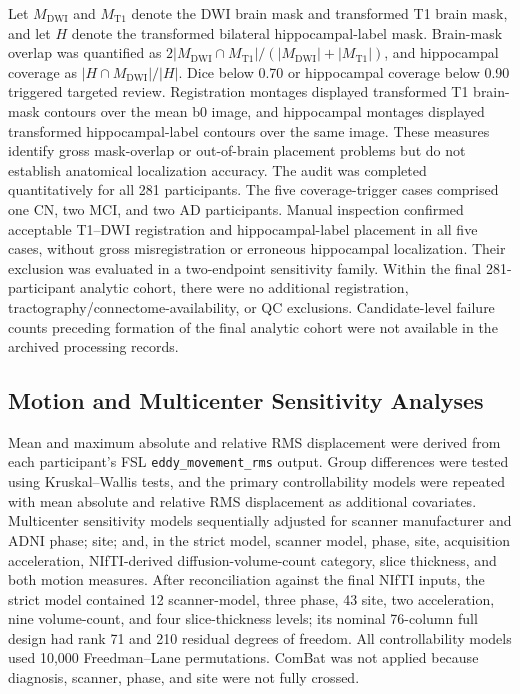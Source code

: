 \documentclass{article}
\begin{document}
Let $M_{\mathrm{DWI}}$ and $M_{\mathrm{T1}}$ denote the DWI brain mask and transformed T1 brain mask, and let $H$ denote the transformed bilateral hippocampal-label mask. Brain-mask overlap was quantified as $2|M_{\mathrm{DWI}}\cap M_{\mathrm{T1}}|/(|M_{\mathrm{DWI}}|+|M_{\mathrm{T1}}|)$, and hippocampal coverage as $|H\cap M_{\mathrm{DWI}}|/|H|$. Dice below 0.70 or hippocampal coverage below 0.90 triggered targeted review. Registration montages displayed transformed T1 brain-mask contours over the mean b0 image, and hippocampal montages displayed transformed hippocampal-label contours over the same image. These measures identify gross mask-overlap or out-of-brain placement problems but do not establish anatomical localization accuracy. The audit was completed quantitatively for all 281 participants. The five coverage-trigger cases comprised one CN, two MCI, and two AD participants. Manual inspection confirmed acceptable T1--DWI registration and hippocampal-label placement in all five cases, without gross misregistration or erroneous hippocampal localization. Their exclusion was evaluated in a two-endpoint sensitivity family. Within the final 281-participant analytic cohort, there were no additional registration, tractography/connectome-availability, or QC exclusions. Candidate-level failure counts preceding formation of the final analytic cohort were not available in the archived processing records.

\subsection{Motion and Multicenter Sensitivity Analyses}
Mean and maximum absolute and relative RMS displacement were derived from each participant's FSL \texttt{eddy\_movement\_rms} output. Group differences were tested using Kruskal--Wallis tests, and the primary controllability models were repeated with mean absolute and relative RMS displacement as additional covariates. Multicenter sensitivity models sequentially adjusted for scanner manufacturer and ADNI phase; site; and, in the strict model, scanner model, phase, site, acquisition acceleration, NIfTI-derived diffusion-volume-count category, slice thickness, and both motion measures. After reconciliation against the final NIfTI inputs, the strict model contained 12 scanner-model, three phase, 43 site, two acceleration, nine volume-count, and four slice-thickness levels; its nominal 76-column full design had rank 71 and 210 residual degrees of freedom. All controllability models used 10,000 Freedman--Lane permutations. ComBat was not applied because diagnosis, scanner, phase, and site were not fully crossed.
\end{document}
